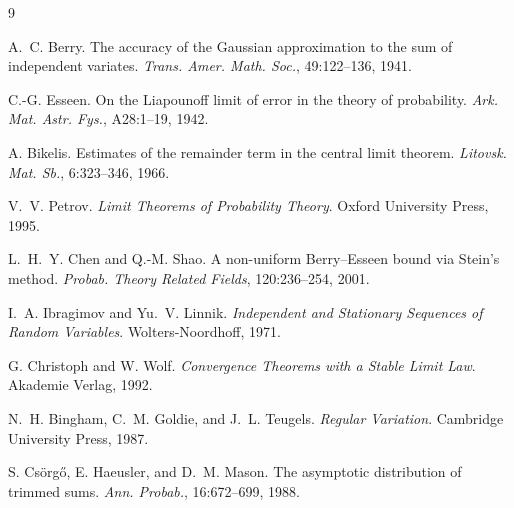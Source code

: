 \documentclass[11pt,a4paper]{article}
\theoremstyle{plain}
\theoremstyle{definition}
\theoremstyle{remark}
\numberwithin{equation}{section}
\newcommand{\1}{\mathbbm{1}}
\begin{document}
\begin{thebibliography}{9}

A.~C. Berry.
\newblock The accuracy of the Gaussian approximation to the sum of independent variates.
\newblock \emph{Trans. Amer. Math. Soc.}, 49:122--136, 1941.

C.-G. Esseen.
\newblock On the Liapounoff limit of error in the theory of probability.
\newblock \emph{Ark. Mat. Astr. Fys.}, A28:1--19, 1942.

A. Bikelis.
\newblock Estimates of the remainder term in the central limit theorem.
\newblock \emph{Litovsk. Mat. Sb.}, 6:323--346, 1966.

V.~V. Petrov.
\newblock \emph{Limit Theorems of Probability Theory}.
\newblock Oxford University Press, 1995.

L.~H.~Y. Chen and Q.-M. Shao.
\newblock A non-uniform Berry--Esseen bound via Stein's method.
\newblock \emph{Probab. Theory Related Fields}, 120:236--254, 2001.

I.~A. Ibragimov and Yu.~V. Linnik.
\newblock \emph{Independent and Stationary Sequences of Random Variables}.
\newblock Wolters-Noordhoff, 1971.

G. Christoph and W. Wolf.
\newblock \emph{Convergence Theorems with a Stable Limit Law}.
\newblock Akademie Verlag, 1992.

N.~H. Bingham, C.~M. Goldie, and J.~L. Teugels.
\newblock \emph{Regular Variation}.
\newblock Cambridge University Press, 1987.

S. Cs\"org\H{o}, E. Haeusler, and D.~M. Mason.
\newblock The asymptotic distribution of trimmed sums.
\newblock \emph{Ann. Probab.}, 16:672--699, 1988.

\end{thebibliography}
\end{document}
